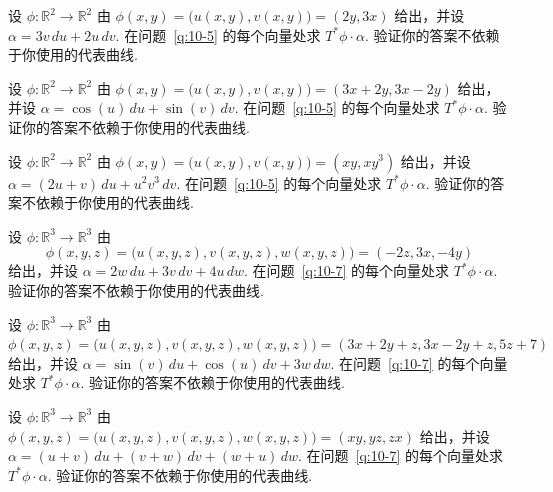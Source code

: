 \begin{question}\label{q:10-15}
设 $\phi:\mathbb{R}^2\to\mathbb{R}^2$ 由 $\phi(x,y)=\bigl(u(x,y),v(x,y)\bigr)=(2y,3x)$ 给出，并设 $\alpha=3v\,du+2u\,dv$. 在问题~\ref{q:10-5} 的每个向量处求 $T^*\phi\cdot\alpha$. 验证你的答案不依赖于你使用的代表曲线.
\end{question}

\begin{question}\label{q:10-16}
设 $\phi:\mathbb{R}^2\to\mathbb{R}^2$ 由 $\phi(x,y)=\bigl(u(x,y),v(x,y)\bigr)=(3x+2y,3x-2y)$ 给出，并设 $\alpha=\cos(u)\,du+\sin(v)\,dv$. 在问题~\ref{q:10-5} 的每个向量处求 $T^*\phi\cdot\alpha$. 验证你的答案不依赖于你使用的代表曲线.
\end{question}

\begin{question}\label{q:10-17}
设 $\phi:\mathbb{R}^2\to\mathbb{R}^2$ 由 $\phi(x,y)=\bigl(u(x,y),v(x,y)\bigr)=(xy,xy^3)$ 给出，并设 $\alpha=(2u+v)\,du+u^2v^3\,dv$. 在问题~\ref{q:10-5} 的每个向量处求 $T^*\phi\cdot\alpha$. 验证你的答案不依赖于你使用的代表曲线.
\end{question}

\begin{question}\label{q:10-18}
设 $\phi:\mathbb{R}^3\to\mathbb{R}^3$ 由
\[
\phi(x,y,z)=\bigl(u(x,y,z),v(x,y,z),w(x,y,z)\bigr)=(-2z,3x,-4y)
\]
给出，并设 $\alpha=2w\,du+3v\,dv+4u\,dw$. 在问题~\ref{q:10-7} 的每个向量处求 $T^*\phi\cdot\alpha$. 验证你的答案不依赖于你使用的代表曲线.
\end{question}

\begin{question}\label{q:10-19}
设 $\phi:\mathbb{R}^3\to\mathbb{R}^3$ 由 $\phi(x,y,z)=\bigl(u(x,y,z),v(x,y,z),w(x,y,z)\bigr)=(3x+2y+z,3x-2y+z,5z+7)$ 给出，并设 $\alpha=\sin(v)\,du+\cos(u)\,dv+3w\,dw$. 在问题~\ref{q:10-7} 的每个向量处求 $T^*\phi\cdot\alpha$. 验证你的答案不依赖于你使用的代表曲线.
\end{question}

\begin{question}\label{q:10-20}
设 $\phi:\mathbb{R}^3\to\mathbb{R}^3$ 由 $\phi(x,y,z)=\bigl(u(x,y,z),v(x,y,z),w(x,y,z)\bigr)=(xy,yz,zx)$ 给出，并设 $\alpha=(u+v)\,du+(v+w)\,dv+(w+u)\,dw$. 在问题~\ref{q:10-7} 的每个向量处求 $T^*\phi\cdot\alpha$. 验证你的答案不依赖于你使用的代表曲线.
\end{question}
